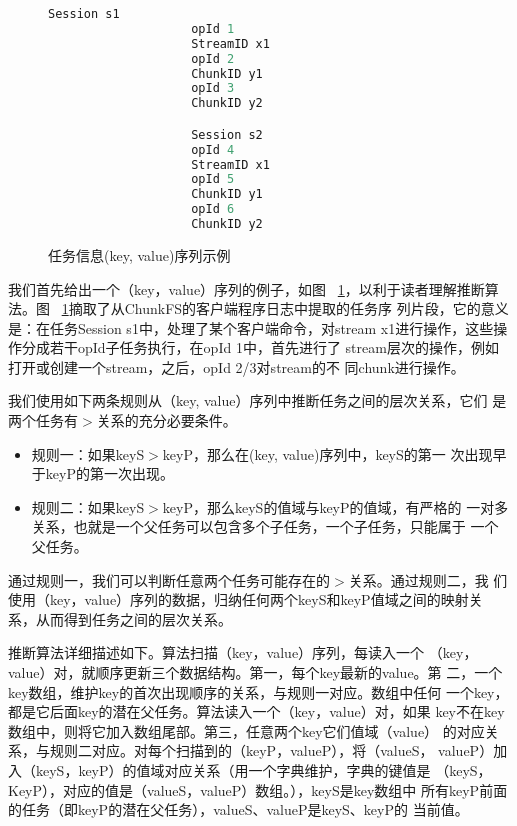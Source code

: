 \begin{figure}
  \centering
  \begin{minipage}{0.8\linewidth}
    \centering
    \begin{lstlisting}[language=C++]
                    Session s1
                    opId 1
                    StreamID x1
                    opId 2
                    ChunkID y1
                    opId 3
                    ChunkID y2

                    Session s2
                    opId 4
                    StreamID x1
                    opId 5
                    ChunkID y1
                    opId 6
                    ChunkID y2
    \end{lstlisting}
    \caption{任务信息(key, value)序列示例}
    \label{fig:keyvalue_sample}
  \end{minipage}
\end{figure}


我们首先给出一个（key，value）序列的例子，如图~
\ref{fig:keyvalue_sample}，以利于读者理解推断算法。图~
\ref{fig:keyvalue_sample}摘取了从ChunkFS的客户端程序日志中提取的任务序
列片段，它的意义是：在任务Session s1中，处理了某个客户端命令，对stream
x1进行操作，这些操作分成若干opId子任务执行，在opId 1中，首先进行了
stream层次的操作，例如打开或创建一个stream，之后，opId 2/3对stream的不
同chunk进行操作。


我们使用如下两条规则从（key, value）序列中推断任务之间的层次关系，它们
是两个任务有$>$关系的充分必要条件。

\begin{itemize}

  \item 规则一：如果keyS$>$keyP，那么在(key, value)序列中，keyS的第一
  次出现早于keyP的第一次出现。

  \item 规则二：如果keyS$>$keyP，那么keyS的值域与keyP的值域，有严格的
  一对多关系，也就是一个父任务可以包含多个子任务，一个子任务，只能属于
  一个父任务。

\end{itemize}

通过规则一，我们可以判断任意两个任务可能存在的$>$关系。通过规则二，我
们使用（key，value）序列的数据，归纳任何两个keyS和keyP值域之间的映射关
系，从而得到任务之间的层次关系。

推断算法详细描述如下。算法扫描（key，value）序列，每读入一个
（key，value）对，就顺序更新三个数据结构。第一，每个key最新的value。第
二，一个key数组，维护key的首次出现顺序的关系，与规则一对应。数组中任何
一个key，都是它后面key的潜在父任务。算法读入一个（key，value）对，如果
key不在key数组中，则将它加入数组尾部。第三，任意两个key它们值域（value）
的对应关系，与规则二对应。对每个扫描到的（keyP，valueP），将（valueS，
valueP）加入（keyS，keyP）的值域对应关系（用一个字典维护，字典的键值是
（keyS，KeyP），对应的值是（valueS，valueP）数组。），keyS是key数组中
所有keyP前面的任务（即keyP的潜在父任务），valueS、valueP是keyS、keyP的
当前值。

